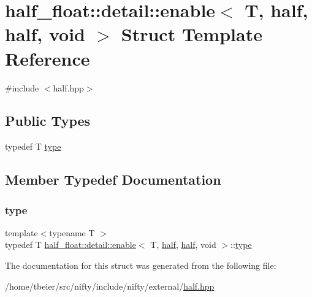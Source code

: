 \hypertarget{structhalf__float_1_1detail_1_1enable_3_01T_00_01half_00_01half_00_01void_01_4}{}\section{half\+\_\+float\+:\+:detail\+:\+:enable$<$ T, half, half, void $>$ Struct Template Reference}
\label{structhalf__float_1_1detail_1_1enable_3_01T_00_01half_00_01half_00_01void_01_4}


{\ttfamily \#include $<$half.\+hpp$>$}

\subsection*{Public Types}
\begin{DoxyCompactItemize}
\item 
typedef T \hyperlink{structhalf__float_1_1detail_1_1enable_3_01T_00_01half_00_01half_00_01void_01_4_aceb3d224d5b5da6539c179cb8cb23bda}{type}
\end{DoxyCompactItemize}


\subsection{Member Typedef Documentation}
\mbox{\label{structhalf__float_1_1detail_1_1enable_3_01T_00_01half_00_01half_00_01void_01_4_aceb3d224d5b5da6539c179cb8cb23bda}} 
\subsubsection{\texorpdfstring{type}{type}}
{\footnotesize\ttfamily template$<$typename T $>$ \\
typedef T \hyperlink{structhalf__float_1_1detail_1_1enable}{half\+\_\+float\+::detail\+::enable}$<$ T, \hyperlink{classhalf__float_1_1half}{half}, \hyperlink{classhalf__float_1_1half}{half}, void $>$\+::\hyperlink{structhalf__float_1_1detail_1_1enable_3_01T_00_01half_00_01half_00_01void_01_4_aceb3d224d5b5da6539c179cb8cb23bda}{type}}



The documentation for this struct was generated from the following file\+:\begin{DoxyCompactItemize}
\item 
/home/tbeier/src/nifty/include/nifty/external/\hyperlink{half_8hpp}{half.\+hpp}\end{DoxyCompactItemize}
